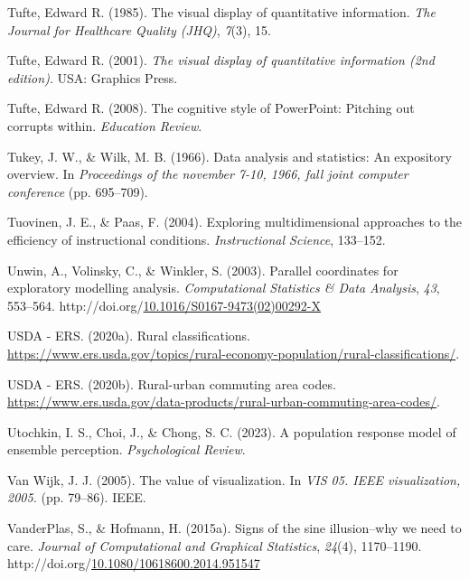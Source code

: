 \documentclass[print]{nuthesis}
\newlength{\cslhangindent}
\newenvironment{CSLReferences}[2]%
{\setlength{\parindent}{0pt}%
\everypar{\setlength{\hangindent}{\cslhangindent}}\ignorespaces}%
{\par}
\begin{document}
\begin{CSLReferences}{1}{0}
\leavevmode{}%
Tufte, Edward R. (1985). The visual display of quantitative information. \emph{The Journal for Healthcare Quality (JHQ)}, \emph{7}(3), 15.

\leavevmode{}%
Tufte, Edward R. (2001). \emph{The visual display of quantitative information (2nd edition)}. USA: Graphics Press.

\leavevmode{}%
Tufte, Edward R. (2008). The cognitive style of PowerPoint: Pitching out corrupts within. \emph{Education Review}.

\leavevmode{}%
Tukey, J. W., \& Wilk, M. B. (1966). Data analysis and statistics: An expository overview. In \emph{Proceedings of the november 7-10, 1966, fall joint computer conference} (pp. 695--709).

\leavevmode{}%
Tuovinen, J. E., \& Paas, F. (2004). Exploring multidimensional approaches to the efficiency of instructional conditions. \emph{Instructional Science}, 133--152.

\leavevmode{}%
Unwin, A., Volinsky, C., \& Winkler, S. (2003). Parallel coordinates for exploratory modelling analysis. \emph{Computational Statistics \& Data Analysis}, \emph{43}, 553--564. http://doi.org/\href{https://doi.org/10.1016/S0167-9473(02)00292-X}{10.1016/S0167-9473(02)00292-X}

\leavevmode{}%
USDA - ERS. (2020a). Rural classifications. \url{https://www.ers.usda.gov/topics/rural-economy-population/rural-classifications/}.

\leavevmode{}%
USDA - ERS. (2020b). Rural-urban commuting area codes. \url{https://www.ers.usda.gov/data-products/rural-urban-commuting-area-codes/}.

\leavevmode{}%
Utochkin, I. S., Choi, J., \& Chong, S. C. (2023). A population response model of ensemble perception. \emph{Psychological Review}.

\leavevmode{}%
Van Wijk, J. J. (2005). The value of visualization. In \emph{VIS 05. IEEE visualization, 2005.} (pp. 79--86). IEEE.

\leavevmode{}%
VanderPlas, S., \& Hofmann, H. (2015a). Signs of the sine illusion--why we need to care. \emph{Journal of Computational and Graphical Statistics}, \emph{24}(4), 1170--1190. http://doi.org/\href{https://doi.org/10.1080/10618600.2014.951547}{10.1080/10618600.2014.951547}


\end{CSLReferences}
\end{document}
